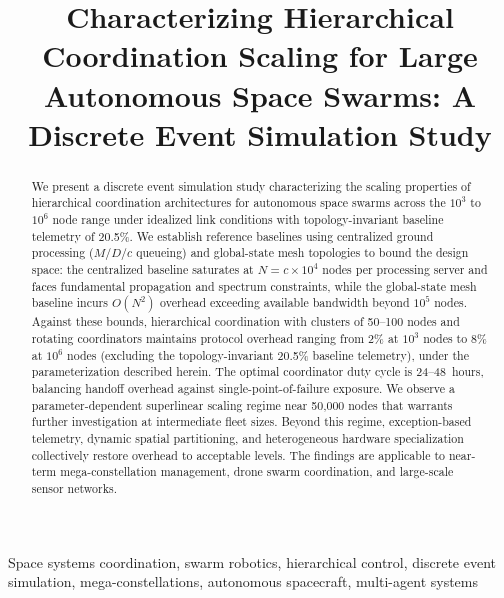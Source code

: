 \documentclass[journal]{IEEEtran}
\begin{document}
\title{Characterizing Hierarchical Coordination Scaling for Large Autonomous Space Swarms: A Discrete Event Simulation Study}

\author{
}


\maketitle

\begin{abstract}
We present a discrete event simulation study characterizing the scaling properties of hierarchical coordination architectures for autonomous space swarms across the $10^3$ to $10^6$ node range under idealized link conditions with topology-invariant baseline telemetry of 20.5\%. We establish reference baselines using centralized ground processing ($M/D/c$ queueing) and global-state mesh topologies to bound the design space: the centralized baseline saturates at $N = c \times 10^4$ nodes per processing server and faces fundamental propagation and spectrum constraints, while the global-state mesh baseline incurs $O(N^2)$ overhead exceeding available bandwidth beyond $10^5$ nodes. Against these bounds, hierarchical coordination with clusters of 50--100 nodes and rotating coordinators maintains protocol overhead ranging from 2\% at $10^3$ nodes to 8\% at $10^6$ nodes (excluding the topology-invariant 20.5\% baseline telemetry), under the parameterization described herein. The optimal coordinator duty cycle is 24--48~hours, balancing handoff overhead against single-point-of-failure exposure. We observe a parameter-dependent superlinear scaling regime near 50{,}000 nodes that warrants further investigation at intermediate fleet sizes. Beyond this regime, exception-based telemetry, dynamic spatial partitioning, and heterogeneous hardware specialization collectively restore overhead to acceptable levels. The findings are applicable to near-term mega-constellation management, drone swarm coordination, and large-scale sensor networks.
\end{abstract}

\begin{IEEEkeywords}
Space systems coordination, swarm robotics, hierarchical control, discrete event simulation, mega-constellations, autonomous spacecraft, multi-agent systems
\end{IEEEkeywords}
\end{document}
